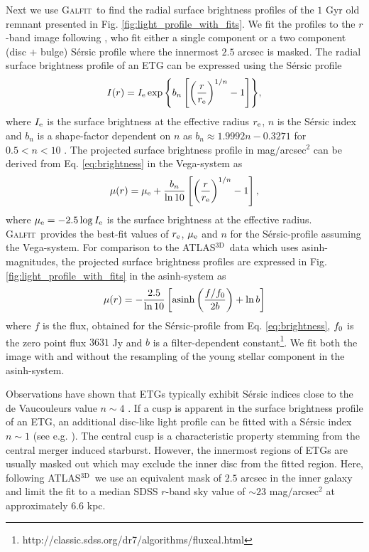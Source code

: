 \documentclass[a4paper,fleqn,usenatbib]{mnras}
\newcommand{\atlas}{\textsc{ATLAS$^\mathrm{3D}$}}
\newcommand{\galfit}{\textsc{Galfit}}
\begin{document}
Next we use \galfit\ to find the radial surface brightness profiles
of the $1$ Gyr old remnant presented in Fig. \ref{fig:light_profile_with_fits}. We fit the
profiles to the $r$-band image following \citet{2013MNRAS.432.1768K}, 
who fit either a single component or a two component (disc $+$ bulge) S\'{e}rsic 
profile where the innermost $2.5$ arcsec is masked. The radial surface 
brightness profile of an ETG can be expressed 
using the S\'{e}rsic profile
\begin{equation} \label{eq:brightness}
 I(r)=I_{\rm{e}} \exp{ \left\{ b_n\left[\left(\frac{r}{r_{\rm{e}}}\right)^{1/n}-1\right]\right\}},
\end{equation}
where $I_{\rm{e}}$ is the surface brightness at the effective radius $r_{\rm{e}}$, $n$ is the 
S\'{e}rsic index and $b_n$ is a shape-factor dependent on $n$ as 
$b_n\approx 1.9992n-0.3271$ for $0.5<n<10$ \citep{1989woga.conf..208C}. The 
projected surface brightness profile in mag$/$arcsec$^2$ 
can be derived from Eq. \ref{eq:brightness} in the Vega-system as
\begin{equation} \label{eq:projected_brightness}
 \mu(r)=\mu_{\rm{e}}+\frac{b_n}{\ln{10}}\left[\left(\frac{r}{r_{\rm{e}}}\right)^{1/n}-1\right],
\end{equation}
where $\mu_{\rm{e}}=-2.5\log{I_{\rm{e}}}$ is the surface brightness at the effective radius. \galfit\
provides the best-fit values of $r_{\rm{e}}$, $\mu_{\rm{e}}$ and $n$ for the S\'{e}rsic-profile assuming the Vega-system.
For comparison to the \atlas\ data which uses asinh-magnitudes, the projected surface 
brightness profiles are expressed in Fig. \ref{fig:light_profile_with_fits} in the asinh-system as
\begin{equation} \label{eq:projected_brightness_asinh}
 \mu(r)=-\frac{2.5}{\ln{10}}\left[\mathrm{asinh}\left(\frac{f/f_{\rm{0}}}{2b}\right)+\ln{b}\right]
\end{equation}
where $f$ is the flux, obtained for the S\'{e}rsic-profile from Eq. \ref{eq:brightness}, $f_{\rm{0}}$ is the zero point flux $3631$ Jy and $b$ 
is a filter-dependent constant\footnote{http://classic.sdss.org/dr7/algorithms/fluxcal.html}. 
We fit both the image with and without the resampling of the
young stellar component in the asinh-system.

Observations have shown that ETGs typically exhibit S\'{e}rsic 
indices close to the de Vaucouleurs value $n\sim4$ \citep{2009ApJS..182..216K}. If a cusp is apparent in 
the surface brightness profile of an ETG, an additional disc-like light
profile  can be fitted with a S\'{e}rsic index $n\sim1$
(see e.g. \citealt{2009ApJS..181..135H}). The central cusp is a characteristic property 
stemming from the central merger induced starburst. 
However, the innermost regions of ETGs are usually masked out which may exclude the inner disc 
from the fitted region.
Here, following \atlas\ we use an equivalent mask of $2.5$ arcsec in the inner galaxy
and limit the fit to a median SDSS $r$-band sky value of $\sim23$ mag$/$arcsec$^2$
at approximately $6.6$ kpc. 
\end{document}
